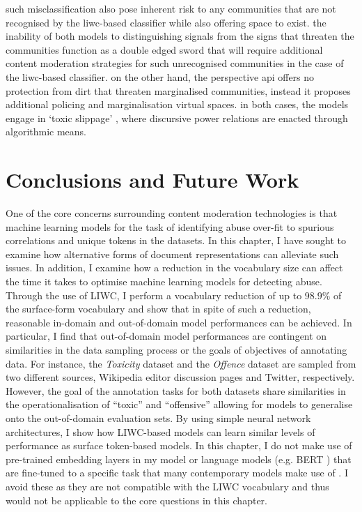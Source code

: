 such misclassification also pose inherent risk to any communities that are not recognised by the liwc-based classifier while also offering space to exist.
the inability of both models to distinguishing signals from the signs that threaten the communities function as a double edged sword that will require additional content moderation strategies for such unrecognised communities in the case of the liwc-based classifier.
on the other hand, the perspective api offers no protection from dirt that threaten marginalised communities, instead it proposes additional policing and marginalisation virtual spaces.
in both cases, the models engage in `toxic slippage' \citep{risam:2015}, where discursive power relations are enacted through algorithmic means.

\section{Conclusions and Future Work}

One of the core concerns surrounding content moderation technologies is that machine learning models for the task of identifying abuse over-fit to spurious correlations and unique tokens in the datasets.
In this chapter, I have sought to examine how alternative forms of document representations can alleviate such issues.
In addition, I examine how a reduction in the vocabulary size can affect the time it takes to optimise machine learning models for detecting abuse.
Through the use of LIWC, I perform a vocabulary reduction of up to $98.9\%$ of the surface-form vocabulary and show that in spite of such a reduction, reasonable in-domain and out-of-domain model performances can be achieved.
In particular, I find that out-of-domain model performances are contingent on similarities in the data sampling process or the goals of objectives of annotating data.
For instance, the \textit{Toxicity} dataset and the \textit{Offence} dataset are sampled from two different sources, Wikipedia editor discussion pages and Twitter, respectively.
However, the goal of the annotation tasks for both datasets share similarities in the operationalisation of ``toxic'' and ``offensive'' allowing for models to generalise onto the out-of-domain evaluation sets.
By using simple neural network architectures, I show how LIWC-based models can learn similar levels of performance as surface token-based models.
In this chapter, I do not make use of pre-trained embedding layers \citep{Park:2017,Kolhatkar:2020} in my model or language models (e.g. BERT \citep{Devlin:2019}) that are fine-tuned to a specific task that many contemporary models make use of \citep{Vidgen_learning:2020,Isaksen:2020}.
I avoid these as they are not compatible with the LIWC vocabulary and thus would not be applicable to the core questions in this chapter.

